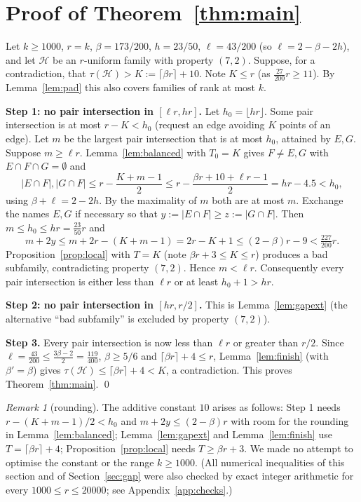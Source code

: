 \documentclass[11pt]{amsart}
\theoremstyle{definition}
\theoremstyle{remark}
\newtheorem{remark}[theorem]{Remark}
\newcommand{\cH}{\mathcal H}
\newcommand{\ceil}[1]{\lceil #1\rceil}
\newcommand{\floor}[1]{\lfloor #1\rfloor}
\begin{document}
\section{Proof of Theorem~\ref{thm:main}}\label{sec:main}

Let $k\ge1000$, $r=k$, $\beta=173/200$, $h=23/50$, $\ell=43/200$ (so $\ell=2-\beta-2h$), and let $\cH$ be an $r$-uniform family with property $(7,2)$. Suppose, for a contradiction, that $\tau(\cH)>K:=\ceil{\beta r}+10$. Note $K\le r$ (as $\tfrac{27}{200}r\ge11$). By Lemma~\ref{lem:pad} this also covers families of rank at most $k$.

\medskip\noindent\textbf{Step 1: no pair intersection in $[\ell r,hr]$.} Let $h_0=\floor{hr}$. Some pair intersection is at most $r-K<h_0$ (request an edge avoiding $K$ points of an edge). Let $m$ be the largest pair intersection that is at most $h_0$, attained by $E,G$. Suppose $m\ge\ell r$. Lemma~\ref{lem:balanced} with $T_0=K$ gives $F\ne E,G$ with $E\cap F\cap G=\emptyset$ and
\[
|E\cap F|,|G\cap F|\le r-\frac{K+m-1}{2}\le r-\frac{\beta r+10+\ell r-1}{2}=hr-4.5<h_0,
\]
using $\beta+\ell=2-2h$. By the maximality of $m$ both are at most $m$. Exchange the names $E,G$ if necessary so that $y:=|E\cap F|\ge z:=|G\cap F|$. Then $m\le h_0\le hr=\tfrac{23}{50}r$ and
\[
m+2y\le m+2r-(K+m-1)=2r-K+1\le(2-\beta)r-9<\tfrac{227}{200}r .
\]
Proposition~\ref{prop:local} with $T=K$ (note $\beta r+3\le K\le r$) produces a bad subfamily, contradicting property $(7,2)$. Hence $m<\ell r$. Consequently every pair intersection is either less than $\ell r$ or at least $h_0+1>hr$.

\medskip\noindent\textbf{Step 2: no pair intersection in $[hr,r/2]$.} This is Lemma~\ref{lem:gapext} (the alternative ``bad subfamily'' is excluded by property $(7,2)$).

\medskip\noindent\textbf{Step 3.} Every pair intersection is now less than $\ell r$ or greater than $r/2$. Since $\ell=\tfrac{43}{200}\le\tfrac{3\beta-2}{2}=\tfrac{119}{400}$, $\beta\ge5/6$ and $\ceil{\beta r}+4\le r$, Lemma~\ref{lem:finish} (with $\beta'=\beta$) gives $\tau(\cH)\le\ceil{\beta r}+4<K$, a contradiction. This proves Theorem~\ref{thm:main}. \qed

\begin{remark}[rounding]
The additive constant $10$ arises as follows: Step 1 needs $r-(K+m-1)/2<h_0$ and $m+2y\le(2-\beta)r$ with room for the rounding in Lemma~\ref{lem:balanced}; Lemma~\ref{lem:gapext} and Lemma~\ref{lem:finish} use $T=\ceil{\beta r}+4$; Proposition~\ref{prop:local} needs $T\ge\beta r+3$. We made no attempt to optimise the constant or the range $k\ge1000$. (All numerical inequalities of this section and of Section~\ref{sec:gap} were also checked by exact integer arithmetic for every $1000\le r\le 20000$; see Appendix~\ref{app:checks}.)
\end{remark}
\end{document}
